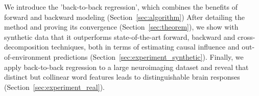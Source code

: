 We introduce the 'back-to-back regression', which combines the benefits of forward and backward modeling (Section~\ref{sec:algorithm}) After detailing the method and proving its convergence (Section~\ref{sec:theorem}), we show with synthetic data that it outperforms state-of-the-art forward, backward and cross-decomposition techniques, both in terms of estimating causal influence and out-of-environment predictions (Section~\ref{sec:experiment_synthetic}). Finally, we apply back-to-back regression to a large neuroimaging dataset and reveal that distinct but collinear word features leads to distinguishable brain responses (Section~\ref{sec:experiment_real}).
